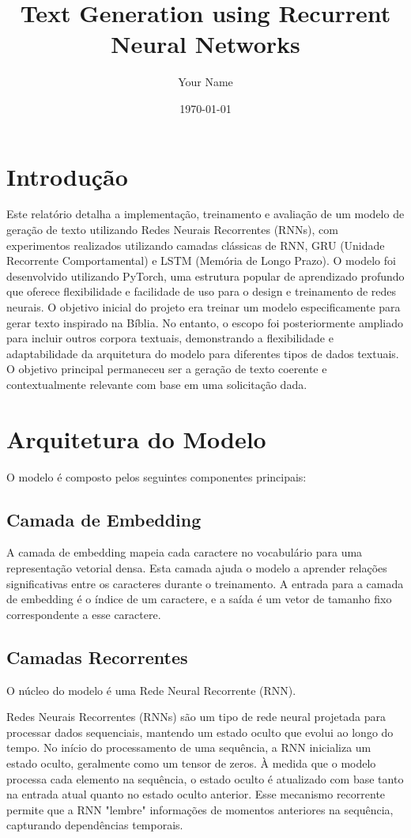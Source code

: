 \documentclass[a4paper,12pt]{article}
\title{Text Generation using Recurrent Neural Networks}
\author{Your Name}
\date{\today}
\begin{document}
\maketitle

\tableofcontents
\newpage

\section{Introdução}
Este relatório detalha a implementação, treinamento e avaliação de um modelo de geração de texto utilizando Redes Neurais Recorrentes (RNNs), com experimentos realizados utilizando camadas clássicas de RNN, GRU (Unidade Recorrente Comportamental) e LSTM (Memória de Longo Prazo). O modelo foi desenvolvido utilizando PyTorch, uma estrutura popular de aprendizado profundo que oferece flexibilidade e facilidade de uso para o design e treinamento de redes neurais. O objetivo inicial do projeto era treinar um modelo especificamente para gerar texto inspirado na Bíblia. No entanto, o escopo foi posteriormente ampliado para incluir outros corpora textuais, demonstrando a flexibilidade e adaptabilidade da arquitetura do modelo para diferentes tipos de dados textuais. O objetivo principal permaneceu ser a geração de texto coerente e contextualmente relevante com base em uma solicitação dada.

\section{Arquitetura do Modelo} O modelo é composto pelos seguintes componentes principais:

\subsection{Camada de Embedding} A camada de embedding mapeia cada caractere no vocabulário para uma representação vetorial densa. Esta camada ajuda o modelo a aprender relações significativas entre os caracteres durante o treinamento. A entrada para a camada de embedding é o índice de um caractere, e a saída é um vetor de tamanho fixo correspondente a esse caractere.

\subsection{Camadas Recorrentes}
O núcleo do modelo é uma Rede Neural Recorrente (RNN).

Redes Neurais Recorrentes (RNNs) são um tipo de rede neural projetada para processar dados sequenciais, mantendo um estado oculto que evolui ao longo do tempo. No início do processamento de uma sequência, a RNN inicializa um estado oculto, geralmente como um tensor de zeros. À medida que o modelo processa cada elemento na sequência, o estado oculto é atualizado com base tanto na entrada atual quanto no estado oculto anterior. Esse mecanismo recorrente permite que a RNN "lembre" informações de momentos anteriores na sequência, capturando dependências temporais.
\end{document}
